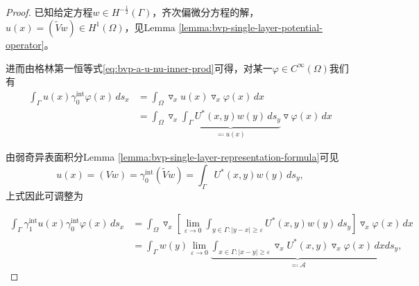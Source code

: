 \begin{proof}
  已知给定方程$w \in H^{-\frac{1}{2}}(\Gamma)$，齐次偏微分方程的解，$u(x) = \left( \widetilde{V}w \right) \in H^{1}(\Omega)$，见Lemma \ref{lemma:bvp-single-layer-potential-operator}。

  进而由格林第一恒等式\eqref{eq:bvp-a-u-nu-inner-prod}可得，对某一$\varphi \in C^{\infty}(\Omega)$我们有
  \begin{equation*}
    \begin{split}
      \int_{\Gamma} u(x) \gamma_{0}^{\text{int}} \varphi(x) \, d s_x
      &= \int_{\Omega} \triangledown_x u(x) \triangledown_x \varphi(x) \, dx \\
      &= \int_{\Omega} \triangledown_{x}
      \underbrace{
      \int_{\Gamma} U^{*}(x,y) w(y) \, d s_y
      }_{\eqqcolon u(x)}
      \triangledown \varphi(x) \, dx
    \end{split}
  \end{equation*}

  由弱奇异表面积分Lemma \ref{lemma:bvp-single-layer-representation-formula}可见
\begin{equation*}
  u(x) = \left(V w \right) = \gamma_{0}^{\text{int}} \left(\widetilde{V} w \right) =\int_{\Gamma} U^{*}(x,y) w(y) \, d s_y,
\end{equation*}
上式因此可调整为

\begin{equation*}
  \begin{split}
    \int_{\Gamma} \gamma_{1}^{\text{int}} u(x) \gamma_{0}^{\text{int}} \varphi(x) \, d s_x &= \int_{\Omega} \triangledown_{x}
    \left[
    \lim_{\varepsilon \rightarrow 0}
    \int_{y \in \Gamma: \left| y - x \right| \ge \varepsilon}
    U^{*}(x,y) w(y) \, d s_y
    \right]
    \triangledown_{x} \varphi(x) \, dx \\
    & = \int_{\Gamma}
    w(y)
    \lim_{\varepsilon \rightarrow 0}
    \underbrace{
    \int_{x \in \Gamma: \left| x - y \right| \ge \varepsilon}
    \triangledown_{x}
    U^{*}(x,y)
    \triangledown_{x}
    \varphi(x)
    \, dx
    }_{\eqqcolon \mathcal{A}}
    d s_y,
  \end{split}
\end{equation*}


\end{proof}
